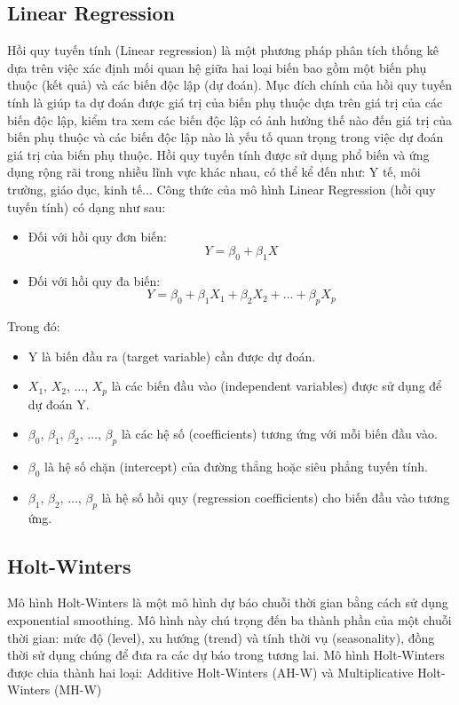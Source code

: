 \documentclass{ieeeojies}
\begin{document}
\subsection{Linear Regression}
Hồi quy tuyến tính (Linear regression) là một phương pháp phân tích thống kê dựa trên việc xác định mối quan hệ giữa hai loại biến bao gồm một biến phụ thuộc (kết quả) và các biến độc lập (dự đoán). Mục đích chính của hồi quy tuyến tính là giúp ta dự đoán được giá trị của biến phụ thuộc dựa trên giá trị của các biến độc lập, kiểm tra xem các biến độc lập có ảnh hưởng thế nào đến giá trị của biến phụ thuộc và các biến độc lập nào là yếu tố quan trọng trong việc dự đoán giá trị của biến phụ thuộc. Hồi quy tuyến tính được sử dụng phổ biến và ứng dụng rộng rãi trong nhiều lĩnh vực khác nhau, có thể kể đến như: Y tế, môi trường, giáo dục, kinh tế...
Công thức của mô hình Linear Regression (hồi quy tuyến tính) có dạng như sau:
\begin{itemize}
    \item Đối với hồi quy đơn biến: 
    \[
 Y = \beta_{0}+ \beta_{1}X   
    \] 
    \item Đối với hồi quy đa biến: 
    \[
    Y = \beta_{0} + \beta_{1}X_{1} + \beta_{2}X_{2} + ... + \beta_{p}X_{p}
    \] 
\end{itemize}
Trong đó:
\begin{itemize}
    \item Y là biến đầu ra (target variable) cần được dự đoán.
    \item  \(X_{1}\), \(X_{2}\), ..., \(X_{p}\) là các biến đầu vào (independent variables) được sử dụng để dự đoán Y.
    \item \(\beta_{0}\), \(\beta_{1}\), \(\beta_{2}\), ..., \(\beta_{p}\) là các hệ số (coefficients) tương ứng với mỗi biến đầu vào.
    \item \(\beta_{0}\) là hệ số chặn (intercept) của đường thẳng hoặc siêu phẳng tuyến tính.
    \item \(\beta_{1}\), \(\beta_{2}\), ..., \(\beta_{p}\) là hệ số hồi quy (regression coefficients) cho biến đầu vào tương ứng.
\end{itemize}

\subsection{Holt-Winters}
Mô hình Holt-Winters là một mô hình dự báo chuỗi thời gian bằng cách sử dụng exponential smoothing. Mô hình này chú trọng đến ba thành phần của một chuỗi thời gian: mức độ (level), xu hướng (trend) và tính thời vụ (seasonality), đồng thời sử dụng chúng để đưa ra các dự báo trong tương lai.
Mô hình Holt-Winters được chia thành hai loại: Additive Holt-Winters (AH-W) và Multiplicative Holt-Winters (MH-W)
\end{document}
